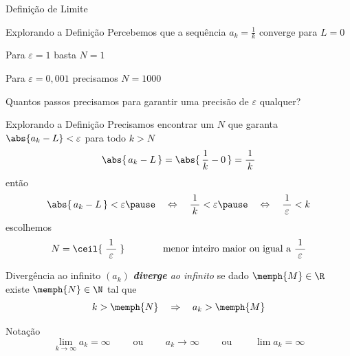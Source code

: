 \begin{frame}{Definição de Limite}
  \centering
  \scalebox{0.9}{}
\end{frame}

\begin{frame}{Explorando a Definição}
    Percebemos que a sequência \(a_k = \frac{1}{k}\) converge para $L = 0$

    \pause
    \vspace{\baselineskip}
    Para $\varepsilon=1$     \tabto{28mm} basta      \tabto{50mm} $N=1$

    \pause
    Para $\varepsilon=0,001$ \tabto{28mm} precisamos \tabto{50mm} $N=1000$

    \pause
    \vspace{\baselineskip}
    Quantos passos precisamos para garantir uma precisão de $\varepsilon$ qualquer?

\end{frame}

\begin{frame}{Explorando a Definição}
    Precisamos encontrar um $N$ que garanta
    \(\abs{a_k-L}<\varepsilon\)
    para todo $k>N$
    \pause
    \[\abs{\,a_k-L\,} = \abs{\,\frac{1}{k}-0\,} = \frac{1}{\,k\,} \]
    \pause
    então
    \[
        \abs{\,a_k-L\,}<\varepsilon
        \pause
        \quad\Leftrightarrow\quad
        \frac{1}{\,k\,} < \varepsilon
        \pause
        \quad\Leftrightarrow\quad
        \frac{1}{\,\varepsilon\,} < k
    \]
    \pause
    escolhemos
    \[
        N = \ceil{\;\frac{1}{\;\varepsilon\;}\;}
        \qquad\qquad\text{menor inteiro maior ou igual a } \frac{1}{\;\varepsilon\;}
    \]
\end{frame}

\begin{frame}{Divergência ao infinito}
    $(a_k)$ \emph{\textbf{diverge} ao infinito} se dado
    $\memph{M}\in\R$ existe $\memph{N}\in\N$ tal que
    \[
      k > \memph{N} \quad \Rightarrow \quad a_k > \memph{M}
    \]

    \pause
    \vspace{\baselineskip}
    Notação
    \[ \lim_{k\to\infty} a_k=\infty
    \qquad\text{ ou }\qquad
    a_k\to \infty
    \qquad\text{ ou }\qquad
    \lim a_k=\infty
    \]

\end{frame}

